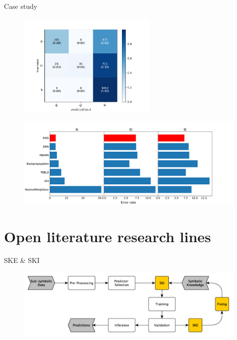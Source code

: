 \documentclass[presentation]{beamer}\mode<presentation>{\usetheme{AMSBolognaFC}}
\begin{document}
\begin{frame}{Case study}
    \framebreak
    
    
    
    \framebreak
    
    \begin{figure}
        \centering
        \includegraphics[width=0.6\textwidth]{figures/dna-rules-confusion-matrix}
    \end{figure}
    
    \framebreak
    
    \begin{figure}
        \centering
        \includegraphics[width=\textwidth]{figures/kins-error-rate}
    \end{figure}
    
\end{frame}


\section{Open literature research lines}


\begin{frame}[c]{SKE \& SKI}
    \begin{figure}
        \centering
        \includegraphics[width=\textwidth]{figures/ske-ski-workflow}
    \end{figure}
\end{frame}
\end{document}
